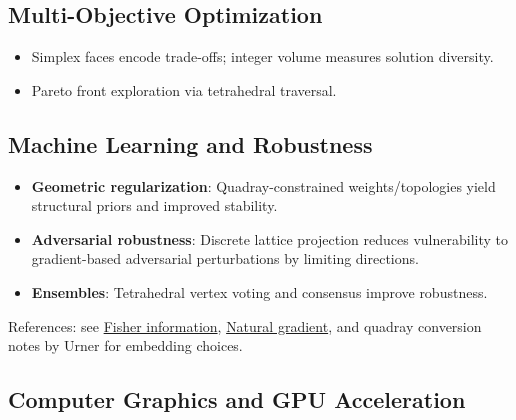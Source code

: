 \documentclass[
  10pt,
]{article}
\providecommand{\tightlist}{%
  \setlength{\itemsep}{0pt}\setlength{\parskip}{0pt}}
\begin{document}
\hypertarget{multi-objective-optimization}{%
\subsection{Multi-Objective
Optimization}\label{multi-objective-optimization}}

\begin{itemize}
\tightlist
\item
  Simplex faces encode trade-offs; integer volume measures solution
  diversity.
\item
  Pareto front exploration via tetrahedral traversal.
\end{itemize}

\hypertarget{machine-learning-and-robustness}{%
\subsection{Machine Learning and
Robustness}\label{machine-learning-and-robustness}}

\begin{itemize}
\tightlist
\item
  \textbf{Geometric regularization}: Quadray-constrained
  weights/topologies yield structural priors and improved stability.
\item
  \textbf{Adversarial robustness}: Discrete lattice projection reduces
  vulnerability to gradient-based adversarial perturbations by limiting
  directions.
\item
  \textbf{Ensembles}: Tetrahedral vertex voting and consensus improve
  robustness.
\end{itemize}

References: see
\href{https://en.wikipedia.org/wiki/Fisher_information}{Fisher
information},
\href{https://en.wikipedia.org/wiki/Natural_gradient}{Natural gradient},
and quadray conversion notes by Urner for embedding choices.

\hypertarget{computer-graphics-and-gpu-acceleration}{%
\subsection{Computer Graphics and GPU
Acceleration}\label{computer-graphics-and-gpu-acceleration}}
\end{document}
